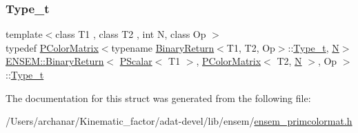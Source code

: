 \subsubsection{\texorpdfstring{Type\_t}{Type\_t}\hspace{0.1cm}{\footnotesize\ttfamily [3/3]}}
{\footnotesize\ttfamily template$<$class T1 , class T2 , int N, class Op $>$ \\
typedef \mbox{\hyperlink{classENSEM_1_1PColorMatrix}{P\+Color\+Matrix}}$<$typename \mbox{\hyperlink{structENSEM_1_1BinaryReturn}{Binary\+Return}}$<$T1, T2, Op$>$\+::\mbox{\hyperlink{structENSEM_1_1BinaryReturn_3_01PScalar_3_01T1_01_4_00_01PColorMatrix_3_01T2_00_01N_01_4_00_01Op_01_4_a97b44a952bd9e0913c09d9be8de65a5e}{Type\+\_\+t}}, \mbox{\hyperlink{adat__devel_2lib_2hadron_2operator__name__util_8cc_a7722c8ecbb62d99aee7ce68b1752f337}{N}}$>$ \mbox{\hyperlink{structENSEM_1_1BinaryReturn}{E\+N\+S\+E\+M\+::\+Binary\+Return}}$<$ \mbox{\hyperlink{classENSEM_1_1PScalar}{P\+Scalar}}$<$ T1 $>$, \mbox{\hyperlink{classENSEM_1_1PColorMatrix}{P\+Color\+Matrix}}$<$ T2, \mbox{\hyperlink{adat__devel_2lib_2hadron_2operator__name__util_8cc_a7722c8ecbb62d99aee7ce68b1752f337}{N}} $>$, Op $>$\+::\mbox{\hyperlink{structENSEM_1_1BinaryReturn_3_01PScalar_3_01T1_01_4_00_01PColorMatrix_3_01T2_00_01N_01_4_00_01Op_01_4_a97b44a952bd9e0913c09d9be8de65a5e}{Type\+\_\+t}}}



The documentation for this struct was generated from the following file\+:\begin{DoxyCompactItemize}
\item 
/\+Users/archanar/\+Kinematic\+\_\+factor/adat-\/devel/lib/ensem/\mbox{\hyperlink{adat-devel_2lib_2ensem_2ensem__primcolormat_8h}{ensem\+\_\+primcolormat.\+h}}\end{DoxyCompactItemize}
